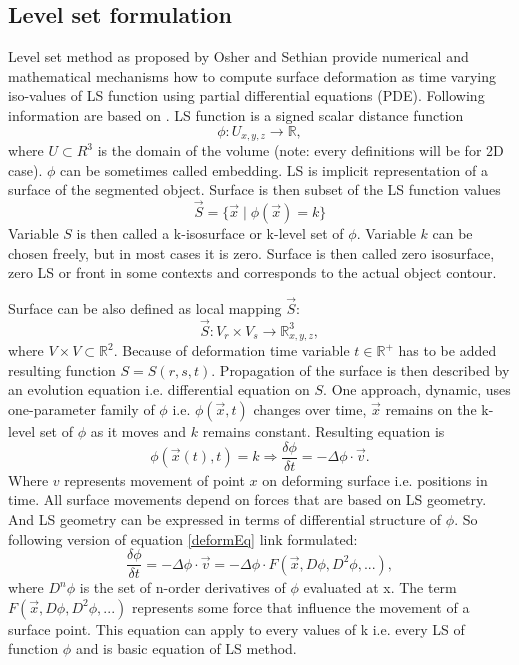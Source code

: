 \subsection{Level set formulation}

Level set method as proposed by Osher and Sethian \cite{sethianLS} provide numerical and mathematical mechanisms how to compute surface deformation as time varying iso-values of LS function using partial differential equations (PDE).
Following information are based on \cite{insightIntoImages}.
LS function is a signed scalar distance function
\begin{equation}
\phi : U_{x,y,z} \rightarrow \mathbb R,
\end{equation}
where $U \subset R^3$ is the domain of the volume (note: every definitions will be for 2D case).
$\phi$ can be sometimes called embedding.
LS is implicit representation of a surface of the segmented object.
Surface is then subset of the LS function values
\begin{equation}
\vec{S} = \{\vec{x}\mid \phi(\vec{x}) = k\}
\end{equation}
Variable $S$ is then called a k-isosurface or k-level set of $\phi$. Variable $k$ can be chosen freely, but in most cases it is zero.
Surface is then called zero isosurface, zero LS or front in some contexts and corresponds to the actual object contour.

Surface can be also defined as local mapping $\vec{S}$:
\begin{equation}
\vec{S}: V_r \times V_s \rightarrow \mathbb R^3_{x,y,z},
\end{equation}
where $V \times V \subset \mathbb R^2$.
Because of deformation time variable $t\in \mathbb R^+$ has to be added resulting function $S = S(r,s,t)$.
Propagation of the surface is then described by an evolution equation i.e. differential equation on $S$.
One approach, dynamic, uses one-parameter family of $\phi$ i.e. $\phi(\vec{x},t)$ changes over time, $\vec{x}$ remains on the k-level set of $\phi$ as it moves and $k$ remains constant.
Resulting equation is
\begin{equation}
\label{deformEq}
\phi(\vec{x}(t),t) = k \Rightarrow \frac{\delta \phi}{\delta t} = - \Delta \phi
\cdot \vec{v}.
\end{equation}
Where $v$ represents movement of point $x$ on deforming surface i.e. positions in time.
All surface movements depend on forces that are based on LS geometry.
And LS geometry can be expressed in terms of differential structure of $\phi$.
So following version of equation \ref{deformEq} link formulated:
\begin{equation}
\frac{\delta\phi}{\delta t} = - \Delta \phi \cdot \vec{v} = - \Delta \phi
\cdot F(\vec{x}, D\phi, D^2\phi, ...),
\end{equation}
where $D^n\phi$ is the set of n-order derivatives of $\phi$ evaluated at x.
The term $F(\vec{x}, D\phi, D^2\phi, ...)$ represents some force that influence the movement of a surface point.
This equation can apply to every values of k i.e. every LS of function $\phi$ and is basic equation of LS method.

